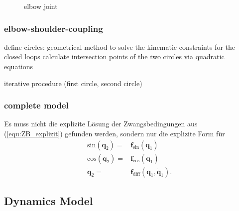\documentclass[letterpaper, 10 pt, conference]{ieeeconf}  %
\begin{document}
\begin{figure}[htb]
    \small
    \begin{minipage}[t]{7.5cm}
        \vspace{0.2cm} %
        
    \end{minipage}
    
    \caption{elbow joint}
    \label{fig:KAS5_elbow}
\end{figure}

\subsubsection{elbow-shoulder-coupling}

define circles: geometrical method to solve the kinematic constraints for the closed loops
calculate intersection points of the two circles via quadratic equations 

iterative procedure (first circle, second circle)

\subsubsection{complete model}



Es muss nicht die explizite Lösung der Zwangsbedingungen aus (\ref{equ:ZB_explizit}) gefunden werden, sondern nur die explizite Form für 
%
\begin{align}
\mathrm{sin}(\bm{q}_2) =& \bm{f}_\mathrm{sin}(\bm{q}_1) \\
\mathrm{cos}(\bm{q}_2) =& \bm{f}_\mathrm{cos}(\bm{q}_1) \\
\dot{\bm{q}}_2 =& \bm{f}_\mathrm{diff}(\bm{q}_1,\dot{\bm{q}}_1).
\end{align}


\subsection{Dynamics Model}
\end{document}
